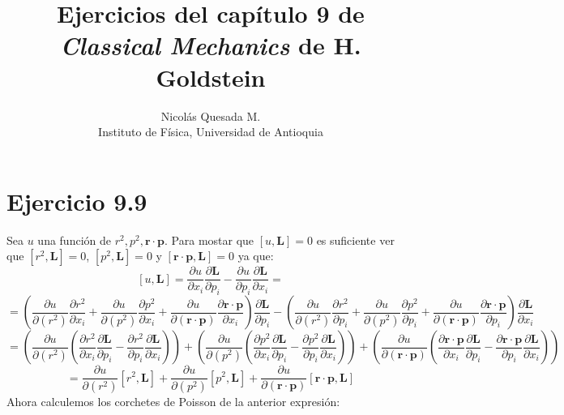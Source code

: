 \documentclass[letterpaper,10pt]{article}
\title{Ejercicios del cap\'itulo 9 de\\ \emph{Classical Mechanics} de H. Goldstein}
\author{Nicol\'as Quesada M. \\ {\small \sf Instituto de F\'isica, Universidad de Antioquia}}
\date{}
\begin{document}
\maketitle



\section*{Ejercicio 9.9}

Sea $u$ una funci\'on de  $r^2,p^2,\textbf{r} \cdot \textbf{p}$. Para mostar que $[u,\textbf{L}]=0$ es suficiente ver que $[r^2,\textbf{L} ]=0$, $[p^2,\textbf{L} ]=0$ y $[\textbf{r} \cdot \textbf{p},\textbf{L} ]=0$ ya que:
$$[u,\textbf{L}]=\frac{\partial u}{\partial x_i}\frac{\partial \textbf{L}}{\partial p_i}-\frac{\partial u}{\partial p_i}\frac{\partial \textbf{L}}{\partial x_i}= $$
$$
=\left(\frac{\partial u}{\partial (r^2)} \frac{\partial r^2}{\partial x_i}
+\frac{\partial u}{\partial (p^2)} \frac{\partial p^2}{\partial x_i}
+\frac{\partial u}{\partial (\textbf{r} \cdot \textbf{p})} \frac{\partial \textbf{r} \cdot \textbf{p}}{\partial x_i}\right)\frac{\partial \textbf{L}}{\partial p_i}
-\left(\frac{\partial u}{\partial (r^2)} \frac{\partial r^2}{\partial p_i}
+\frac{\partial u}{\partial (p^2)} \frac{\partial p^2}{\partial p_i}
+\frac{\partial u}{\partial (\textbf{r} \cdot \textbf{p})} \frac{\partial \textbf{r} \cdot \textbf{p}}{\partial p_i}\right)\frac{\partial \textbf{L}}{\partial x_i}$$
$$= \left(\frac{\partial u}{\partial (r^2)} \left(\frac{\partial r^2}{\partial x_i}  \frac{\partial \textbf{L}}{\partial p_i}- \frac{\partial r^2}{\partial p_i} \frac{\partial \textbf{L}}{\partial x_i}  \right) \right) +
\left(\frac{\partial u}{\partial (p^2)} \left(\frac{\partial p^2}{\partial x_i}  \frac{\partial \textbf{L}}{\partial p_i}- \frac{\partial p^2}{\partial p_i} \frac{\partial \textbf{L}}{\partial x_i}  \right) \right)+
\left(\frac{\partial u}{\partial (\textbf{r} \cdot \textbf{p})} \left(\frac{\partial \textbf{r} \cdot \textbf{p}}{\partial x_i}  \frac{\partial \textbf{L}}{\partial p_i}- \frac{\partial \textbf{r} \cdot \textbf{p}}{\partial p_i} \frac{\partial \textbf{L}}{\partial x_i}  \right) \right)
$$
$$
=\frac{\partial u}{\partial (r^2)} [r^2,\textbf{L}]+\frac{\partial u}{\partial (p^2)} [p^2,\textbf{L}]+\frac{\partial u}{\partial (\textbf{r} \cdot \textbf{p})} [\textbf{r} \cdot \textbf{p},\textbf{L}]
$$
Ahora calculemos los corchetes de Poisson de la anterior expresi\'on:
\end{document}
